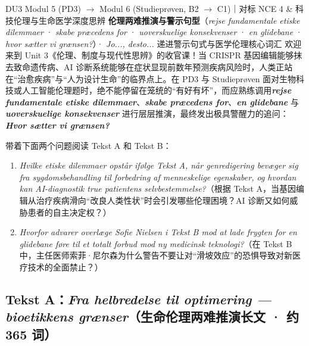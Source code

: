 {DU3 Modul 5 (PD3) $\rightarrow$ Modul 6 (Studieprøven, B2 $\rightarrow$ C1)｜对标 NCE 4 \& 科技伦理与生命医学深度思辨}
{\textbf{伦理两难推演与警示句型}（\textit{rejse fundamentale etiske dilemmaer} · \textit{skabe præcedens for} · \textit{uoverskuelige konsekvenser} · \textit{en glidebane} · \textit{hvor sætter vi grænsen?}）· \textit{Jo..., desto...} 递进警示句式与医学伦理核心词汇}
{欢迎来到 Unit 3《伦理、制度与现代性思辨》的收官课！当 CRISPR 基因编辑能够抹去致命遗传病、AI 诊断系统能够在症状显现前数年预测疾病风险时，人类正站在“治愈疾病”与“人为设计生命”的临界点上。在 PD3 与 Studieprøven 面对生物科技或人工智能伦理题时，绝不能停留在笼统的“有好有坏”，而应熟练调用\textbf{\textit{rejse fundamentale etiske dilemmaer}}、\textbf{\textit{skabe præcedens for}}、\textbf{\textit{en glidebane}} 与 \textbf{\textit{uoverskuelige konsekvenser}} 进行层层推演，最终发出极具警醒力的追问：\textbf{\textit{Hvor sætter vi grænsen?}}}

\begin{foerduleaeser}
带着下面两个问题阅读 Tekst A 和 Tekst B：
\begin{enumerate}
  \item \textit{Hvilke etiske dilemmaer opstår ifølge Tekst A, når genredigering bevæger sig fra sygdomsbehandling til forbedring af menneskelige egenskaber, og hvordan kan AI-diagnostik true patientens selvbestemmelse?}（根据 Tekst A，当基因编辑从治疗疾病滑向“改良人类性状”时会引发哪些伦理困境？AI 诊断又如何威胁患者的自主决定权？）
  \item \textit{Hvorfor advarer overlæge Sofie Nielsen i Tekst B mod at lade frygten for en glidebane føre til et totalt forbud mod ny medicinsk teknologi?}（在 Tekst B 中，主任医师索菲·尼尔森为什么警告不要让对“滑坡效应”的恐惧导致对新医疗技术的全面禁止？）
\end{enumerate}
\end{foerduleaeser}


\subsection*{Tekst A：\textit{Fra helbredelse til optimering --- bioetikkens grænser}（生命伦理两难推演长文 · 约 365 词）}

